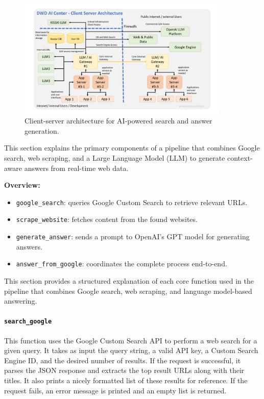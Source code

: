 \begin{figure}[htbp]
  \centering
  \includegraphics[width=0.9\textwidth]{images/AI_Centre_Client_Server_Architecture.png}
  \caption{Client-server architecture for AI-powered search and answer generation.}
  \label{fig:ai-architecture}
\end{figure}


This section explains the primary components of a pipeline that combines Google search, web scraping, and a Large Language Model (LLM) to generate context-aware answers from real-time web data.

\textbf{Overview:}
\begin{itemize}
\item \texttt{google\_search}: queries Google Custom Search to retrieve relevant URLs.
\item \texttt{scrape\_website}: fetches content from the found websites.
\item \texttt{generate\_answer}: sends a prompt to OpenAI's GPT model for generating answers.
\item \texttt{answer\_from\_google}: coordinates the complete process end-to-end.
\end{itemize}


This section provides a structured explanation of each core function used in the pipeline that combines Google search, web scraping, and language model-based answering.

\paragraph{\texttt{search\_google}}
This function uses the Google Custom Search API to perform a web search for a given query. It takes as input the query string, a valid API key, a Custom Search Engine ID, and the desired number of results. If the request is successful, it parses the JSON response and extracts the top result URLs along with their titles. It also prints a nicely formatted list of these results for reference. If the request fails, an error message is printed and an empty list is returned.

